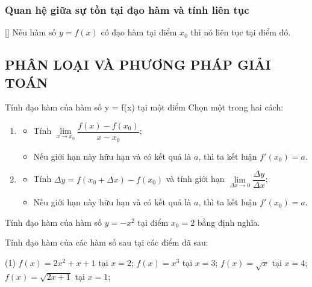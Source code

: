 \begin{bt}
\subsubsection{Quan hệ giữa sự tồn tại đạo hàm và tính liên tục}
[\iconMT]  Nếu hàm số  $y=f(x)$  có đạo hàm tại điểm $x_0$   thì nó liên tục tại điểm đó.

\subsection{PHÂN LOẠI VÀ PHƯƠNG PHÁP GIẢI TOÁN}

\begin{dang}{Tính đạo hàm của hàm số y = f(x) tại một điểm}
	Chọn một trong hai cách:
	\begin{enumerate}[\iconCH]
		\item {}
		\begin{itemize}
			\item [$\bullet$] Tính $\lim\limits_{x\to x_0}\dfrac{f(x)-f(x_0)}{x-x_0}$;
			\item [$\bullet$] Nếu giới hạn này hữu hạn và có kết quả là $a$, thì ta kết luận $f'(x_0)=a$.
		\end{itemize}
		\item {}
		\begin{itemize}
			\item [$\bullet$] Tính $\Delta y=f(x_0+\Delta x)-f(x_0)$ và tính giới hạn $\lim\limits_{\Delta x \to 0}\dfrac{\Delta y}{\Delta x}$;
			\item [$\bullet$] Nếu giới hạn này hữu hạn và có kết quả là $a$, thì ta kết luận $f'(x_0)=a$.
		\end{itemize}
	\end{enumerate}
\end{dang}

\begin{vd}%
	Tính đạo hàm của hàm số $y=-x^2$ tại điểm $x_0=2$ bằng định nghĩa.
	\loigiai{
	}
\end{vd}

\begin{vd}%
	Tính đạo hàm của các hàm số sau tại các điểm đã sau:
	\begin{tasks}(1)
		\task $f(x)=2x^2+x+1$ tại $x=2$;
		\task $f(x)=x^3$ tại $x=3$;
		\task $f(x)=\sqrt{x}$ tại $x=4$;
		\task $f(x)=\sqrt{2x+1}$ tại $x=1$;
	\end{tasks}
	\loigiai{
		
	}
\end{vd}


\end{bt}
